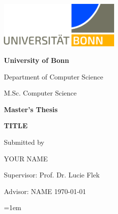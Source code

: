 \documentclass[twoside, 12pt,  footinclude=true,  headinclude=true,  cleardoublepage=empty]{scrbook}
\begin{document}
\begin{titlepage}
\centering
{\includegraphics[width=6cm]{logo/UNI_Bonn_Logo.jpg}}
\vspace{0.8cm}

\textbf{University of Bonn}
  
Department of Computer Science
            
M.Sc. Computer Science
\vspace{1in}

{\Large \bfseries Master's Thesis}
\vspace{1in}

{\LARGE \bfseries TITLE}
\vspace{1in}

{\large Submitted by}	

{\LARGE YOUR NAME\par}
\vspace{1in}

Supervisor: Prof. Dr. Lucie Flek
\par
Advisor: NAME
\vfill
\today
\end{titlepage}

\frontmatter




\tableofcontents

\listoffigures
\listoftables

\mainmatter










\nocite{*}
\emergencystretch=1em
\printbibliography[heading=bibintoc]



\appendix

\end{document}
